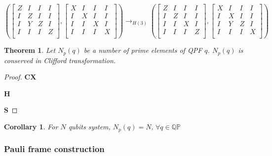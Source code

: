 \documentclass[a4paper,12pt]{article}
\newtheorem{theorem}{Theorem}
\newtheorem{corollary}{Corollary}
\begin{document}
\begin{equation}
    \left( 
        \begin{bmatrix}
        Z & I & I & I \\
        I & Z & I & I \\
        I & Y & Z & I \\
        I & I & I & Z \\
        \end{bmatrix},
        \begin{bmatrix}
        X & I & I & I \\
        I & X & I & I \\
        I & I & X & I \\
        I & I & I & X \\
        \end{bmatrix}
    \right) \rightarrow_{H(3)} 
    \left( 
        \begin{bmatrix}
        Z & I & I & I \\
        I & Z & I & I \\
        I & I & X & I \\
        I & I & I & Z \\
        \end{bmatrix},
        \begin{bmatrix}
        X & I & I & I \\
        I & X & I & I \\
        I & Y & Z & I \\
        I & I & I & X \\
        \end{bmatrix}
    \right) 
\end{equation}


\begin{theorem}
    Let $N_p(q)$ be a number of prime elements of QPF $q$.
    $N_p(q)$ is conserved in Clifford transformation.
\end{theorem}
\begin{proof}
    \textbf{CX} 

    \textbf{H} 

    \textbf{S} 
\end{proof}

\begin{corollary}
    For $N$ qubits system, $N_p(q) = N, \, \forall q \in \mathbb{QP}$ 
\end{corollary}


\subsubsection{Pauli frame construction}
\end{document}
